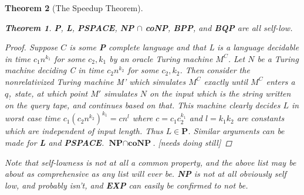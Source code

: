 \documentclass{article}
\theoremstyle{definition}
\theoremstyle{plain}
\theoremstyle{theorem}
\newtheorem{theorem}{Theorem}[section]
\begin{document}
\begin{theorem}[The Speedup Theorem]
\begin{theorem}
    \textbf{P}, \textbf{L}, \textbf{PSPACE}, \textbf{NP} $\cap$ \textbf{coNP}, \textbf{BPP}, and \textbf{BQP} are all self-low.
\end{theorem}
\begin{proof}
    Suppose $C$ is some \textbf{P} complete language and that L is a language decidable in time $c_1n^{k_1}$ for some $c_2,k_1$ by an oracle Turing machine $M^C$. Let $N$ be a Turing machine deciding C in time $c_2n^{k_2}$ for some $c_2,k_2$. Then consider the nonrelativized Turing machine M' which simulates $M^C$ exactly until $M^C$ enters a $q_?$ state, at which point $M'$ simulates $N$ on the input which is the string written on the query tape, and continues based on that. This machine clearly decides $L$ in worst case time $c_1(c_2n^{k_2})^{k_1} = cn^l$ where $c=c_1c_2^{k_1}$ and $l=k_1k_2$ are constants which are independent of input length. Thus $L \in \textbf{P}$. Similar arguments can be made for \textbf{L} and \textbf{PSPACE}. $\textbf{NP} \cap \textbf{coNP}$. [needs doing still]
\end{proof}
\par 
Note that self-lowness is not at all a common property, and the above list may be about as comprehensive as any list will ever be. \textbf{NP} is not at all obviously self low, and probably isn't, and \textbf{EXP} can easily be confirmed to not be. 


\end{theorem}
\end{document}
